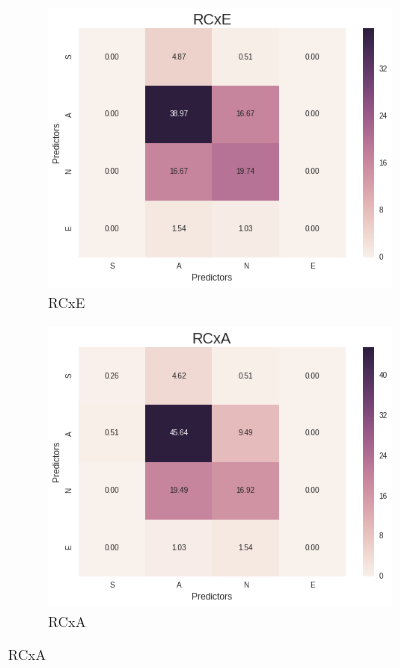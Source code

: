 \documentclass[12pt,a4paper,catalan]{article}
\begin{document}
\begin{figure}[h]
\centering
\begin{subfigure}{.4\textwidth}
  \centering
  \includegraphics[width=\linewidth]{img/heatmap_rcxe_primersegon_tercer.png}
  \caption{RCxE}
\end{subfigure}
\begin{subfigure}{.4\textwidth}
  \centering
  \includegraphics[width=\linewidth]{img/heatmap_rcxa_primersegon_tercer.png}
  \caption{RCxA}
\end{subfigure}
\end{figure}
\end{document}
